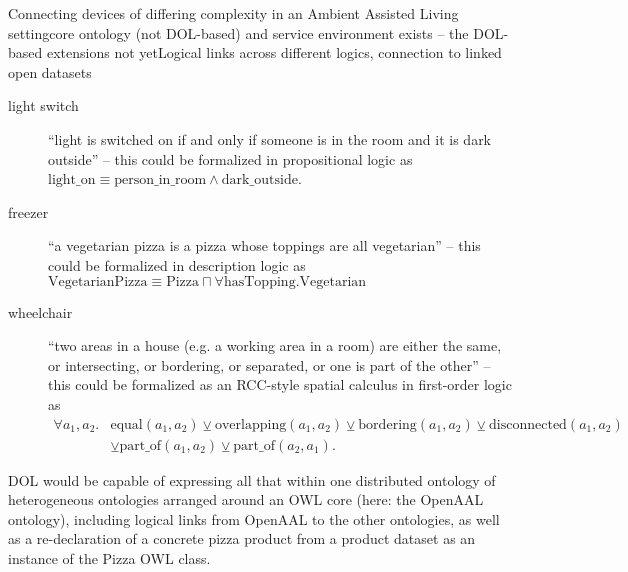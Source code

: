 \documentclass[%
\ifpretendfinal
final%
\else
draft%
\fi,
a4paper,
wd]{isov2}
\makeatletter
\newcommand*{\eg}{e.g.\@\xspace}
\makeatother
\begin{document}
\begin{usecase}{Connecting devices of differing complexity in an Ambient Assisted Living setting}{core ontology (not DOL-based) and service environment exists – the DOL-based extensions not yet}{Logical links across different logics, connection to linked open datasets}
  \begin{description}
  \item[light switch] “light is switched on if and only if someone is in the room and it is dark outside” – this could be formalized in propositional logic as $\mathrm{light\_on}\equiv\mathrm{person\_in\_room}\wedge\mathrm{dark\_outside}$.
  \item[freezer] “a vegetarian pizza is a pizza whose toppings are all vegetarian” – this could be formalized in description logic as $\mathrm{VegetarianPizza}\equiv\mathrm{Pizza}\sqcap \forall \mathrm{hasTopping}.\mathrm{Vegetarian}$
  \item[wheelchair] “two areas in a house (\eg a working area in a room) are either the same, or intersecting, or bordering, or separated, or one is part of the other” – this could be formalized as an RCC-style spatial calculus in first-order logic as $$\begin{array}{ll}\forall a_1, a_2 . & \mathrm{equal}(a_1, a_2) \veebar \mathrm{overlapping}(a_1, a_2) \veebar \mathrm{bordering}(a_1, a_2) \veebar \mathrm{disconnected}(a_1, a_2) \\
&\veebar \mathrm{part\_of}(a_1, a_2) \veebar \mathrm{part\_of}(a_2, a_1).\end{array}$$
  \end{description}
  
  DOL would be capable of expressing all that within one distributed ontology of heterogeneous ontologies arranged around an OWL core (here: the OpenAAL ontology), including logical links from OpenAAL to the other ontologies, as well as a re-declaration of a concrete pizza product from a product dataset as an instance of the Pizza OWL class.
\end{usecase}
\end{document}
